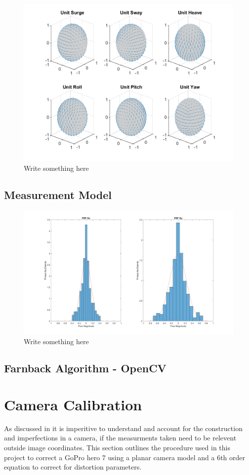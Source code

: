 \documentclass{UoNMCHA}
\numberwithin{equation}{section}
\begin{document}
\begin{figure}[ht]
    \begin{center}
        \includegraphics[width=.6\linewidth]{Figures/Unit_Movement}
        \caption{Write something here}
        \label{fig:Unit_Movement}
    \end{center}
\end{figure}
\subsection{Measurement Model}
\begin{figure}[ht]
    \begin{center}
        \includegraphics[width=.6\linewidth]{Figures/Matlab/GoPro_Noise_PDF}
        \caption{Write something here}
        \label{fig:GoPro_Noise_PDF}
    \end{center}
\end{figure}
\subsection{Farnback Algorithm - OpenCV}

\newpage
\section{Camera Calibration}
As discussed in  it is imperitive to understand and account for the construction and imperfections in a camera, if the measurments taken need to be relevent outside image coordinates. This section outlines the procedure used in this project to correct a GoPro hero 7 using a planar camera model and a 6th order equation to correct for distortion parameters.
\end{document}
